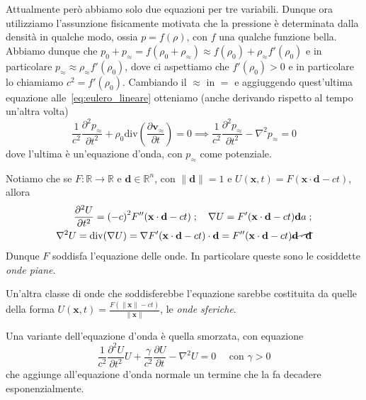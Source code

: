 Attualmente però abbiamo solo due equazioni per tre variabili. Dunque ora
utilizziamo l'assunzione fisicamente motivata che la pressione è determinata
dalla densità in qualche modo, ossia \(p = f{(\rho)}\), con \(f\) una qualche
funzione bella. Abbiamo dunque che \(p_{0} + p_\approx = f{(\rho_{0} +
\rho_\approx)} \approx f{(\rho_{0})} + \rho_\approx f'{(\rho_{0})}\) e in
particolare \(p_\approx \approx \rho_\approx f'{(\rho_{0})}\), dove ci
aspettiamo che \(f'{(\rho_{0})} > 0\) e in particolare lo chiamiamo \(c^2 =
f'{(\rho_{0})}\). Cambiando il \(\approx\) in \(=\) e aggiuggendo quest'ultima
equazione alle~\eqref{eq:eulero_lineare} otteniamo (anche derivando rispetto al
tempo un'altra volta)
\begin{equation}\label{eq:acu_onda}
    \frac{1}{c^2} \frac{\partial ^2 p_\approx}{\partial t ^2} + \rho_{0}
    \mathrm{div} {\left(\frac{\partial \mathbf{v} _\approx}{\partial t}\right)} = 0
    \implies \frac{1}{c^2} \frac{\partial^2 p_\approx}{\partial t ^2 } - \nabla
    ^2 p_\approx = 0
\end{equation}
dove l'ultima è un'equazione d'onda, con \(p_\approx\) come potenziale.

Notiamo che se \(F : \mathbb{R} \to \mathbb{R}\) e \(\mathbf{d}  \in
\mathbb{R}^{n}\), con \(\|\mathbf{d} \| = 1\) e \(U{(\mathbf{x} , t)} =
F{(\mathbf{x}  \cdot  \mathbf{d}  - ct)}\), allora
\begin{align*}
  \frac{\partial ^2 U}{\partial t^2} = {(-c)}^2 F''{(\mathbf{x}  \cdot
  \mathbf{d}  - ct)} \;; \quad \nabla U = F'{(\mathbf{x} \cdot \mathbf{d} - ct)}
  \mathbf{d} a\;;\\\nabla ^2 U = \mathrm{div}{(\nabla U)} = \nabla
  F'{(\mathbf{x} \cdot \mathbf{d} - ct)} \cdot \mathbf{d} = F''{(\mathbf{x}
  \cdot \mathbf{d}  - ct)} \cancel{\mathbf{d}  \cdot \mathbf{d} }
\end{align*}
Dunque \(F\) soddisfa l'equazione delle onde. In particolare queste sono le
cosiddette \emph{onde piane}.

Un'altra classe di onde che soddisferebbe l'equazione sarebbe costituita da
quelle della forma \(U{(\mathbf{x} ,
t)} = \frac{F{(\|\mathbf{x} \| - ct)}}{\|\mathbf{x} \|}\), le \emph{onde
sferiche}.

Una variante dell'equazione d'onda è quella smorzata, con equazione
\begin{equation}\label{eq:onda_smorzata}
  \frac{1}{c^2} \frac{\partial ^2 U}{\partial t^2} U + \frac{\gamma}{c^2}
  \frac{\partial U}{\partial t} - \nabla ^2 U = 0 \quad \text{ con }\gamma>0
\end{equation}
che aggiunge all'equazione d'onda normale un termine che la fa decadere
esponenzialmente.


